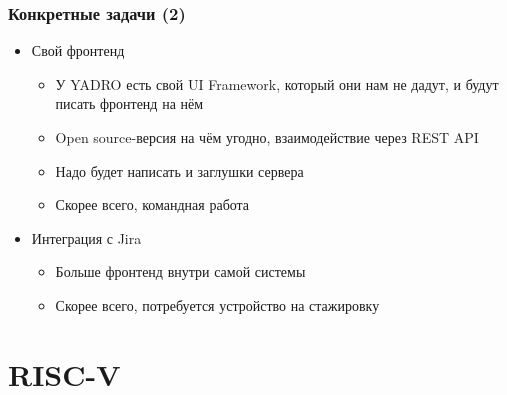 \documentclass{slides-style}
\begin{document}
    \begin{frame}
        \frametitle{Конкретные задачи (2)}
        \begin{itemize}
            \item Свой фронтенд
            \begin{itemize}
                \item У YADRO есть свой UI Framework, который они нам не дадут, и будут писать фронтенд на нём
                \item Open source-версия на чём угодно, взаимодействие через REST API
                \item Надо будет написать и заглушки сервера
                \item Скорее всего, командная работа
            \end{itemize}
            \item Интеграция с Jira
            \begin{itemize}
                \item Больше фронтенд внутри самой системы
                \item Скорее всего, потребуется устройство на стажировку
            \end{itemize}
        \end{itemize}
    \end{frame}

    \section{RISC-V}
\end{document}
